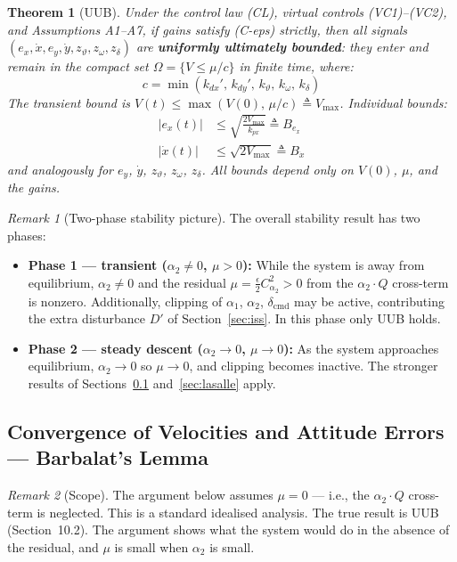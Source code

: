 \documentclass[11pt,a4paper]{article}
\theoremstyle{plain}
\newtheorem{theorem}{Theorem}[section]
\theoremstyle{remark}
\newtheorem{remark}{Remark}[section]
\newcommand{\vth}{\vartheta}
\newcommand{\zth}{z_{\vth}}
\newcommand{\zom}{z_{\omega}}
\newcommand{\zdel}{z_{\delta}}
\newcommand{\dcmd}{\delta_{\mathrm{cmd}}}
\begin{document}
\begin{theorem}[UUB]
Under the control law (CL), virtual controls (VC1)--(VC2), and Assumptions A1--A7, if gains satisfy (C-eps) strictly, then all signals $(e_x, \dot x, e_y, \dot y, \zth, \zom, \zdel)$ are \textbf{uniformly ultimately bounded}: they enter and remain in the compact set $\Omega = \{V \leq \mu/c\}$ in finite time, where:
\[
  c = \min(k_{dx}',\, k_{dy}',\, k_\vth,\, k_\omega,\, k_\delta)
\]
The transient bound is $V(t) \leq \max(V(0),\, \mu/c) \triangleq V_{\max}$. Individual bounds:
\begin{align}
  |e_x(t)| &\leq \sqrt{\frac{2V_{\max}}{k_{px}}} \triangleq B_{e_x} \\
  |\dot x(t)| &\leq \sqrt{2V_{\max}} \triangleq B_{\dot x}
\end{align}
and analogously for $e_y$, $\dot y$, $\zth$, $\zom$, $\zdel$. All bounds depend only on $V(0)$, $\mu$, and the gains.
\end{theorem}

\begin{remark}[Two-phase stability picture]
The overall stability result has two phases:
\begin{itemize}
  \item \textbf{Phase 1 --- transient ($\alpha_2 \neq 0$, $\mu > 0$):} While the system is away from equilibrium, $\alpha_2 \neq 0$ and the residual $\mu = \tfrac{\epsilon}{2}C_{\alpha_2}^2 > 0$ from the $\alpha_2 \cdot Q$ cross-term is nonzero. Additionally, clipping of $\alpha_1$, $\alpha_2$, $\dcmd$ may be active, contributing the extra disturbance $D'$ of Section~\ref{sec:iss}. In this phase only UUB holds.
  \item \textbf{Phase 2 --- steady descent ($\alpha_2 \to 0$, $\mu \to 0$):} As the system approaches equilibrium, $\alpha_2 \to 0$ so $\mu \to 0$, and clipping becomes inactive. The stronger results of Sections~\ref{sec:barbalat} and~\ref{sec:lasalle} apply.
\end{itemize}
\end{remark}

\subsection{Convergence of Velocities and Attitude Errors --- Barbalat's Lemma}
\label{sec:barbalat}

\begin{remark}[Scope]
The argument below assumes $\mu = 0$ --- i.e., the $\alpha_2 \cdot Q$ cross-term is neglected. This is a standard idealised analysis. The true result is UUB (Section~10.2). The argument shows what the system would do in the absence of the residual, and $\mu$ is small when $\alpha_2$ is small.
\end{remark}
\end{document}
